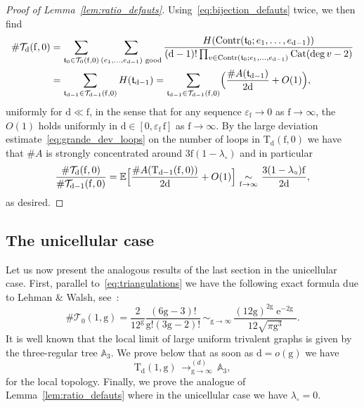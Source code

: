 \documentclass[JEP,XML,SOM,Unicode,NoFloatCountersInSection,NoEqCountersInSection]{cedram}
\DeclareMathOperator{\Cat}{Cat}
\theoremstyle{plain}
\theoremstyle{definition}
\theoremstyle{remark}
\newcommand{\E}{\mathbb{E}}
\newcommand{\e}{\operatorname{e}}
\newcommand{\Triv}{\mathrm{T}}
\newcommand{\face}{\mathrm{f}}
\newcommand{\defect}{\mathrm{d}}
\newcommand{\gen}{\mathrm{g}}
\newcommand{\cvloi}[1][n]{\,\mathop{\longrightarrow}^{(d)}_{#1 \to \infty}\,}
\newcommand{\equi}[1][n]{\,\mathop{\sim}^{}_{#1 \to \infty}\,}
\begin{document}
\begin{proof}[Proof of Lemma~\ref{lem:ratio_defauts}]
Using~\eqref{eq:bijection_defauts} twice, we then find
\begin{align*}
\# \mathcal{T}_\defect(\face, 0)
&= \sum_{\mathfrak{t}_0 \in \mathcal{T}_0(\face, 0)} \sum_{(e_1, \dots, e_{\defect-1}) \text{ good}} \frac{H(\mathrm{Contr}(\mathfrak{t}_0 ; e_1, \dots, e_{ \defect-1}))}{(\defect-1)! \prod_{v \in \mathrm{Contr}(\mathfrak{t}_0 ; e_1, \dots, e_{\defect-1})} \Cat(\deg v - 2)}
\\
&= \sum_{ \mathfrak{t}_{ \defect-1} \in \mathcal{T}_{ \defect-1}(\face,0) } H(\mathfrak{t}_{\defect-1})
= \sum_{ \mathfrak{t}_{ \defect-1} \in \mathcal{T}_{ \defect-1}(\face,0)} \Bigl(\frac{\# A(\mathfrak{t}_{ \defect-1})}{2 \defect} + O(1)\Bigr),
\end{align*}
uniformly for $\defect \ll \face$, in the sense that for any sequence $\varepsilon_\face \to 0$ as $\face \to \infty$, the $O(1)$ holds uniformly in $\defect \in [0, \varepsilon_\face\, \face]$ as $\face \to \infty$.
By the large deviation estimate~\eqref{eq:grande_dev_loops} on the number of loops in $\mathrm{T}_{ \defect}(\face,0)$ we have that $\#A$ is strongly concentrated around $3\face (1-\lambda_{\circ})$ and in particular
\[
\frac{\# \mathcal{T}_\defect(\face, 0)}{\# \mathcal{T}_{\defect-1}(\face, 0)}
= \E\Bigl[\frac{\# A(\Triv_{ \defect-1}(\face,0))}{2 \defect} + O(1)\Bigr]
\equi[\face] \frac{ 3(1-\lambda_\circ) \face}{2 \defect},
\]
as desired.
\end{proof}

\subsection{The unicellular case}
\label{ssec:unicellularestimates}

Let us now present the analogous results of the last section in the unicellular case. First, parallel to~\eqref{eq:triangulations} we have the following exact formula due to Lehman \& Walsh, see~\cite[Eq.\,(9)]{WL72}:
\begin{equation}\label{eq:triangulations_high_gen}
\#\mathcal{T}_{0}(1,\gen) = \frac{2}{12^{\gen}} \frac{(6\gen-3)!}{\gen!(3\gen-2)!}
\equi[\gen] \frac{(12 \gen)^{2\gen} \e^{-2\gen}}{12 \sqrt{\pi \gen^3}}.
\end{equation}
It is well known that the local limit of large uniform trivalent graphs is given by the three-regular tree $\mathbb{A}_3$.
We prove below that as soon as $ \defect =o(\gen)$ we have
\begin{equation} \label{eq:convthree-regular}
\Triv_{ \defect}(1, \gen) \cvloi[\gen] \mathbb{A}_3,
\end{equation}
for the local topology. Finally, we prove the analogue of Lemma~\ref{lem:ratio_defauts} where in the unicellular case we have $\lambda_{\circ} =0$.
\end{document}
